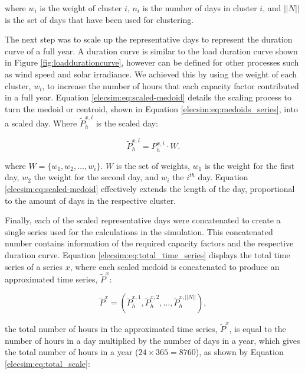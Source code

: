 \noindent where $w_i$ is the weight of cluster $i$, $n_i$ is the number of days in cluster $i$, and $||N||$ is the set of days that have been used for clustering. 


The next step was to scale up the representative days to represent the duration curve of a full year. A duration curve is similar to the load duration curve shown in Figure \ref{fig:loaddurationcurve}, however can be defined for other processes such as wind speed and solar irradiance. We achieved this by using the weight of each cluster, $w_i$, to increase the number of hours that each capacity factor contributed in a full year. Equation \ref{elecsim:eq:scaled-medoid} details the scaling process to turn the medoid or centroid, shown in Equation \ref{elecsim:eq:medoids_series}, into a scaled day. Where $\widetilde{P}^{x,i}_{h}$ is the scaled day:

\begin{equation}
\label{elecsim:eq:scaled-medoid}
\widetilde{P}^{x,i}_{h} = P_h^{x,i}\cdot W.
\end{equation} 

\noindent where $W=\{w_1,w_2,\ldots,w_i\}$. $W$ is the set of weights, $w_1$ is the weight for the first day, $w_2$ the weight for the second day, and $w_i$ the $i^{th}$ day. Equation \ref{elecsim:eq:scaled-medoid} effectively extends the length of the day, proportional to the amount of days in the respective cluster.



Finally, each of the scaled representative days were concatenated to create a single series used for the calculations in the simulation. This concatenated number contains information of the required capacity factors and the respective duration curve. Equation \ref{elecsim:eq:total_time_series} displays the total time series of a series $x$, where each scaled medoid is concatenated to produce an approximated time series, $\widetilde{P}^x$:


\begin{equation}
\label{elecsim:eq:total_time_series}
\widetilde{P}^x=\left(\widetilde{P}^{x,1}_{h},\widetilde{P}^{x,2}_{h},\ldots, \widetilde{P}^{x,||N||}_{h}\right),
\end{equation}

\noindent the total number of hours in the approximated time series, $\widetilde{P}^x$, is equal to the number of hours in a day multiplied by the number of days in a year, which gives the total number of hours in a year ($24\times 365=8760$), as shown by Equation \ref{elecsim:eq:total_scale}:


